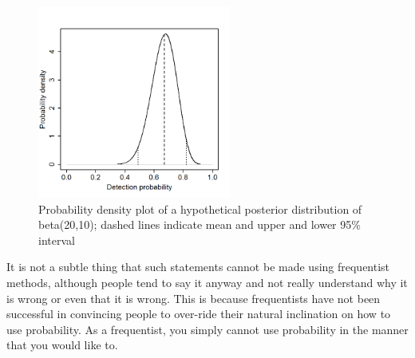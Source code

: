 \begin{figure}
\begin{center}
\includegraphics[height=2.5in]{Ch3-Bayes/figs/densityvsdetection}
\end{center}
\caption{Probability density plot of a hypothetical
 posterior distribution of beta(20,10); dashed lines 
 indicate mean and upper and lower 95\% interval}
\label{densityvsdetection.fig}
\end{figure}

It is not a subtle thing that such statements 
cannot be made using frequentist methods, although people tend to say
it anyway and not really understand why it is wrong or even that it is
wrong. This is  because %
frequentists have not been successful in convincing people to
over-ride their natural inclination on how to use probability.  As a
frequentist, you simply cannot use probability in the manner that you
would like to.

